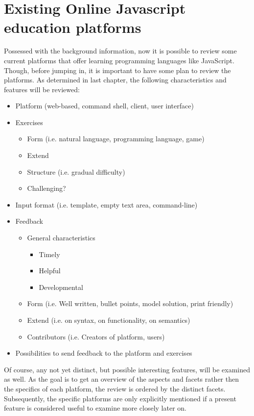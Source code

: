 \documentclass{article}
\begin{document}
\section{Existing Online Javascript education platforms} 
Possessed with the background information, now it is possible to
review some current platforms that offer learning programming languages like 
JavaScript. Though, before jumping in, it is important to have some plan to
review the platforms. As determined in last chapter, the following 
characteristics and features will be reviewed:
\begin{itemize}
  \item Platform (web-based, command shell, client, user interface)
  \item Exercises
    \begin{itemize}
      \item Form (i.e. natural language, programming language, game)
	  \item Extend
	  \item Structure (i.e. gradual difficulty)
	  \item Challenging?
    \end{itemize}
  \item Input format (i.e. template, empty text area, command-line)
  \item Feedback
    \begin{itemize}
	  \item General characteristics
	    \begin{itemize}
          \item Timely
	      \item Helpful
	      \item Developmental
        \end{itemize}
	  \item Form (i.e. Well written, bullet points, model solution, print friendly)
	  \item Extend (i.e. on syntax, on functionality, on semantics)
	  \item Contributors (i.e. Creators of platform, users)
	\end{itemize}
  \item Possibilities to send feedback to the platform and exercises
\end{itemize}

Of course, any not yet distinct, but possible interesting features, 
will be examined as well. As the goal is to get an overview of the aspects and
facets rather then the specifics of each platform, the review is ordered by 
the distinct facets. Subsequently, the specific platforms are only
explicitly mentioned if
a present feature is considered useful to examine more closely later on.
\end{document}
